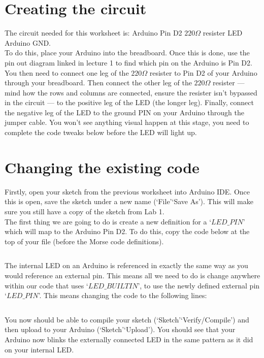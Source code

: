 \documentclass[11pt,a4paper]{article}
\begin{document}
\section{Creating the circuit}
The circuit needed for this worksheet is: Arduino Pin D2 \textrightarrow $220\Omega$ resister \textrightarrow LED
\textrightarrow Arduino GND.\\

\noindent
To do this, place your Arduino into the breadboard. Once this is done, use the pin out diagram linked in lecture 1 to find which pin on the Arduino is Pin D2. You then need to connect one leg of the $220\Omega$ resister to Pin D2 of your Arduino through your breadboard. Then connect the other leg of the $220\Omega$ resister  --- mind how the rows and columns are connected, ensure the resister isn't bypassed in the circuit --- to the positive leg of the LED (the longer leg). Finally, connect the negative leg of the LED to the ground PIN on your Arduino through the jumper cable. You won't see anything visual happen at this stage, you need to complete the code tweaks below before the LED will light up.

\section{Changing the existing code}
Firstly, open your sketch from the previous worksheet into Arduino IDE. Once this is open, save the sketch under a new name (`File'\textrightarrow `Save As'). This will make sure you still have a copy of the sketch from Lab 1.\\

\noindent
The first thing we are going to do is create a new definition for a `$LED\_PIN$' which will map to the Arduino Pin D2. To do this, copy the code below at the top of your file (before the Morse code definitions).

\inputminted{arduino}{./src/1-pin-definition.txt}

\noindent
The internal LED on an Arduino is referenced in exactly the same way as you would reference an external pin. This means all we need to do is change anywhere within our code that uses `$LED\_BUILTIN$', to use the newly defined external pin `$LED\_PIN$'. This means changing the code to the following lines:

\inputminted{arduino}{./src/2-pins.txt}

\noindent
You now should be able to compile your sketch (`Sketch'\textrightarrow `Verify/Compile') and then upload to your Arduino (`Sketch'\textrightarrow `Upload'). You should see that your Arduino now blinks the externally connected LED in the same pattern as it did on your internal LED.
\end{document}
